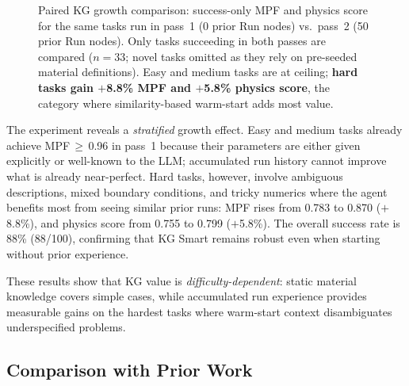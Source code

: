 \documentclass[twocolumn]{article}
\begin{document}
\begin{figure}[htbp]
  \centering
  \resizebox{\linewidth}{!}{}
  \caption{Paired KG growth comparison: success-only MPF and physics
    score for the same tasks run in pass~1 (0 prior Run nodes) vs.\
    pass~2 (50 prior Run nodes).  Only tasks succeeding in both passes
    are compared ($n{=}33$; novel tasks omitted as they rely on
    pre-seeded material definitions).  Easy and medium tasks are at
    ceiling; \textbf{hard tasks gain $+$8.8\% MPF and $+$5.8\% physics
    score}, the category where similarity-based warm-start adds most
    value.}
  \label{fig:kg-growth}
\end{figure}

The experiment reveals a \emph{stratified} growth effect.  Easy and
medium tasks already achieve MPF\,$\geq$\,0.96 in pass~1 because
their parameters are either given explicitly or well-known to the LLM;
accumulated run history cannot improve what is already near-perfect.
Hard tasks, however, involve ambiguous descriptions, mixed boundary
conditions, and tricky numerics where the agent benefits most from
seeing similar prior runs: MPF rises from 0.783 to 0.870 ($+$8.8\%),
and physics score from 0.755 to 0.799 ($+$5.8\%).  The overall
success rate is 88\% (88/100), confirming that KG Smart remains robust
even when starting without prior experience.

These results show that KG value is \emph{difficulty-dependent}: static
material knowledge covers simple cases, while accumulated run
experience provides measurable gains on the hardest tasks where
warm-start context disambiguates underspecified problems.

\subsection{Comparison with Prior Work}
\end{document}
